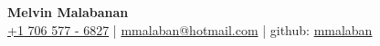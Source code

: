 \documentclass[11pt, letterpaper]{article}
\begin{document}
\begin{center}
    {\Large \textbf{Melvin Malabanan}} \\ [0.5em]
    \href{tel:+17065776827}{+1 706 577 - 6827} \quad | \quad
    \href{mailto:mmalaban@hotmailcom}{mmalaban@hotmail.com} \quad | \quad
    github: \href{https://github.com/mmalaban}{mmalaban}
\end{center}

\vspace{0.5em}


\end{document}

